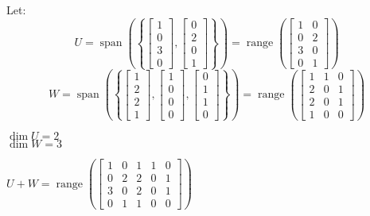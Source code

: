 \documentclass[letterpaper,12pt,fleqn]{article}
\DeclareMathOperator{\spn}{span}
\DeclareMathOperator{\range}{range}
\begin{document}
\begin{example}
  Let:
  \[U=\spn\left(\left\{\begin{bmatrix}1 \\ 0 \\ 3 \\ 0\end{bmatrix},
  \begin{bmatrix}0 \\ 2 \\ 0 \\ 1\end{bmatrix}\right\}\right)=
    \range\left(\begin{bmatrix}1 & 0 \\ 0 & 2 \\ 3 & 0 \\ 0 & 1\end{bmatrix}\right)\]
  \[W=\spn\left(\left\{\begin{bmatrix}1 \\ 2 \\ 2 \\ 1\end{bmatrix},
  \begin{bmatrix}1 \\ 0 \\ 0 \\ 0\end{bmatrix},
  \begin{bmatrix}0 \\ 1 \\ 1 \\ 0\end{bmatrix}\right\}\right)=
    \range\left(\begin{bmatrix}1 & 1 & 0 \\ 2 & 0 & 1 \\ 2 & 0 & 1 \\ 1 & 0 & 0
    \end{bmatrix}\right)\]

  $\dim U=2$ \\
  $\dim W=3$

  $U+W=\range\left(\begin{bmatrix}1 & 0 & 1 & 1 & 0 \\ 0 & 2 & 2 & 0 & 1 \\
      3 & 0 & 2 & 0 & 1 \\ 0 & 1 & 1 & 0 & 0\end{bmatrix}\right)$


\end{example}
\end{document}
